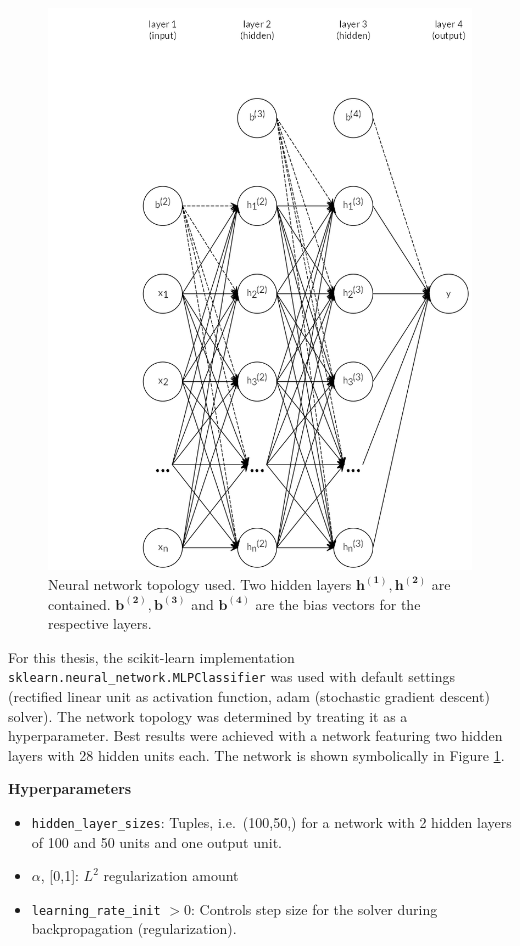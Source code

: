 \documentclass[
  11pt,
  a4paper,
  DIV=12,captions=tableheading,oneside,titlepage]{scrbook}
\providecommand{\tightlist}{%
  \setlength{\itemsep}{0pt}\setlength{\parskip}{0pt}}
\begin{document}
\begin{figure}

{\centering \includegraphics[width=0.7\linewidth]{figures/methods/mlp-structure} 

}

\caption{Neural network topology used. Two hidden layers \(\mathbf{h^{(1)}, h^{(2)}}\) are contained. \(\mathbf{b^{(2)}, b^{(3)}}\) and \(\mathbf{b^{(4)}}\) are the bias vectors for the respective layers.}\label{fig:mlp-graph}
\end{figure}

For this thesis, the scikit-learn implementation \texttt{sklearn.neural\_network.MLPClassifier} was used with default settings (rectified linear unit as activation function, adam (stochastic gradient descent) solver). The network topology was determined by treating it as a hyperparameter. Best results were achieved with a network featuring two hidden layers with 28 hidden units each. The network is shown symbolically in Figure \ref{fig:mlp-graph}.

\textbf{Hyperparameters}

\begin{itemize}
\tightlist
\item
  \texttt{hidden\_layer\_sizes}: Tuples, i.e.~(100,50,) for a network with 2 hidden layers of 100 and 50 units and one output unit.
\item
  \(\alpha\), {[}0,1{]}: \(L^2\) regularization amount
\item
  \texttt{learning\_rate\_init} \(>0\): Controls step size for the solver during backpropagation (regularization).
\end{itemize}
\end{document}
